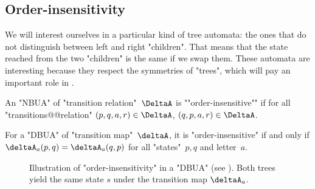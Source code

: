 \documentclass[a4paper,UKenglish,cleveref, autoref, thm-restate]{lipics-v2021}
\begin{document}
\subsection{Order-insensitivity}\label{sec:OrderAutomata}

We will interest ourselves in a particular kind of tree automata: the ones that do not distinguish between left and right "children".
That means that the state reached from the two "children" is the same if we swap them. These automata are
interesting because they respect the symmetries of "trees", which will pay an important role in .

\begin{definition}
	\AP An "NBUA" of "transition relation"~$\DeltaA$ is ""order-insensitive"" if for all "transitions@@relation" $(p,q,a,r) \in \DeltaA$,
	$(q,p,a,r) \in \DeltaA$.
\end{definition}

\begin{remark}\label{def:order-insensitive}
	For a "DBUA" of "transition map"~$\deltaA$, it is "order-insensitive" if and only if
	$\deltaA_a (p,q) = \deltaA_a (q,p)$ for all "states"~$p,q$ and letter~$a$.
\end{remark}


\begin{figure}[h]
	\centering
	\caption{Illustration of "order-insensitivity" in a "DBUA" (see ).
		Both trees yield the same state $s$ under the transition map $\deltaA_a$.}
	\label{fig:order-insensitivity}
\end{figure}
\end{document}
